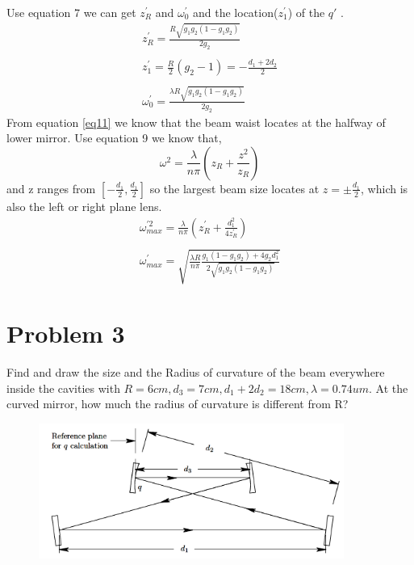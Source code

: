 \documentclass{article}
\begin{document}
Use equation 7 we can get $z_{R}^{'}$ and $ \omega_{0}^{'}$ and the location($z_{1}^{'}$) of the $ q' $ .
\begin{equation}\label{eq11}
	\begin{array}{l}
	z_{R}^{'}=\frac{R\sqrt{g_1g_2(1-g_1g_2)}}{2g_2}\\
	\\
	z_{1}^{'}=\frac{R}{2}(g_2-1)=-\frac{d_1+2d_2}{2}\\
	\\
	\omega_{0}^{'}=\frac{\lambda R\sqrt{g_1g_2(1-g_1g_2)}}{2g_2}
	\end{array}
\end{equation}
From equation \ref{eq11} we know that the beam waist locates at the halfway of lower mirror. Use equation 9 we know that,
\begin{equation*}
\omega^2=\frac{\lambda}{n\pi}(z_R+\frac{z^2}{z_R})
\end{equation*}
and z ranges from $[-\frac{d_1}{2},\frac{d_1}{2}]$ so the largest beam size locates at $ z=\pm\frac{d_1}{2} $, which is also the left or right plane lens.
\begin{equation}
	\begin{array}{l}
	\omega_{max}^{'2}=\frac{\lambda}{n\pi}(z_R^{'}+\frac{d_1^2}{4z_R^{'}})\\
	\\
	\omega_{max}^{'}=\sqrt{\frac{\lambda R}{n\pi}\frac{ g_1(1-g_1g_2)+4g_2d_1^2}{2\sqrt{g_1g_2(1-g_1g_2)}}}
	\end{array}
\end{equation}

\section{Problem 3}
Find and draw the size and the Radius of curvature of the beam everywhere inside the cavities with $ R= 6 cm, d_3 = 7 cm, d_1 +2d_2 = 18 cm,  \lambda=0.74 um $. At the curved mirror, how much the radius of curvature is different from R?

\begin{figure}[ht]
	\centering
	\includegraphics[width=10cm]{f4.png}
	\caption{}
\end{figure}
\end{document}
